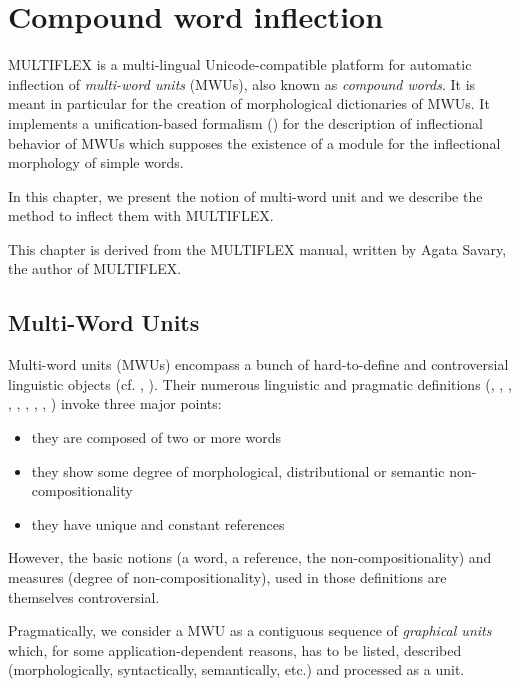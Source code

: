 \chapter{Compound word inflection}

\label{chap-multiflex}
MULTIFLEX is a multi-lingual Unicode-compatible platform for automatic inflection of 
\textit{multi-word units} (MWUs), also known as \textit{compound words}. It is
meant in particular for the creation of morphological dictionaries of MWUs. 
It implements a unification-based formalism (\cite{Savary05}) 
for the description of inflectional behavior of MWUs which supposes the
existence of a module for the inflectional morphology of simple words.
 
\bigskip
\noindent In this chapter, we present the notion of multi-word unit and we
describe the method to inflect them with MULTIFLEX. 

\bigskip
\noindent This chapter is derived from the MULTIFLEX manual, written by Agata
Savary, the author of MULTIFLEX.

\section{Multi-Word Units}
\label{section:MWUs}
Multi-word units (MWUs) encompass a bunch of hard-to-define and controversial 
linguistic objects (cf. \cite{HabertJacquemin93}, \cite{Corbin92}). Their numerous 
linguistic and pragmatic definitions (\cite{Benven74}, \cite{Downing77}, \cite{Levi78}, 
\cite{Bauer83}, \cite{Gross90}, \cite{Anscombre90}, \cite{max-1993},
\cite{Gross96}, \cite{Cadiot92}) invoke three major points:

\begin{itemize}
\item they are composed of two or more words
\item they show some degree of morphological, distributional or semantic non-compositionality
\item they have unique and constant references 
\end{itemize}

\bigskip
\noindent However, the basic notions (a word, a reference, the
non-compositionality) and measures (degree of non-compositionality), used 
in those definitions are themselves controversial.

\bigskip
\noindent Pragmatically, we consider a MWU as a 
contiguous sequence of \textit{graphical units} which,
for some application-dependent reasons, has to be listed, described 
(morphologically, syntactically, semantically, etc.) 
and processed as a unit.

